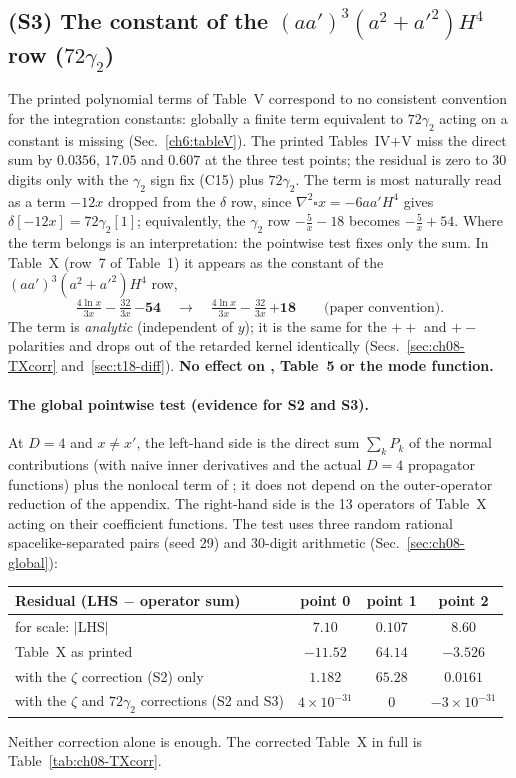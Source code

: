 \subsection*{(S3) The constant of the $(aa')^3(a^2+a'^2)H^4$ row ($72\gamma_2$)}
\begin{discbox}
The printed polynomial terms of Table~V correspond to no consistent convention for the integration constants: globally a finite term equivalent
to $72\gamma_2$ acting on a constant is missing (Sec.~\ref{ch6:tableV}). The printed Tables~IV$+$V miss the direct sum by $0.0356$, $17.05$ and
$0.607$ at the three test points; the residual is zero to 30 digits only with the $\gamma_2$ sign fix (C15) plus $72\gamma_2$.
The term is most naturally read as a term $-12x$ dropped from the $\delta$ row, since $\nabla^2\square x=-6aa'H^4$ gives $\delta[-12x]=72\gamma_2[1]$;
equivalently, the $\gamma_2$ row $-\tfrac5x-18$ becomes $-\tfrac5x+54$. Where the term belongs is an interpretation: the pointwise test fixes only the
sum. In Table~X (row~7 of \PII{} Table~1) it appears as the constant of the $(aa')^3(a^2+a'^2)H^4$ row,
\[
\tfrac{4\ln x}{3x}-\tfrac{32}{3x}\,\mathbf{-54}\quad\longrightarrow\quad\tfrac{4\ln x}{3x}-\tfrac{32}{3x}\,\mathbf{+18}
\qquad\text{(paper convention)}.
\]
The term is \emph{analytic} (independent of $y$); it is the same for the $++$ and $+-$ polarities and drops out of the retarded kernel identically
(Secs.~\ref{sec:ch08-TXcorr} and~\ref{sec:t18-diff}). \textbf{No effect on , Table~5 or the mode function.}
\end{discbox}

\paragraph{The global pointwise test (evidence for S2 and S3).} At $D=4$ and $x\neq x'$, the left-hand side is the direct sum $\sum_kP_k$ of the
normal contributions (with naive inner derivatives and the actual $D=4$ propagator functions) plus the nonlocal term of ; it does not depend
on the outer-operator reduction of the appendix. The right-hand side is the 13 operators of Table~X acting on their coefficient functions. The test
uses three random rational spacelike-separated pairs (seed 29) and 30-digit arithmetic (Sec.~\ref{sec:ch08-global}):
\begin{center}\small
\renewcommand{\arraystretch}{1.2}
\begin{tabular}{lccc}
\toprule
Residual (LHS $-$ operator sum) & point 0 & point 1 & point 2\\
\midrule
for scale: $|$LHS$|$ & $7.10$ & $0.107$ & $8.60$\\
Table~X as printed & $-11.52$ & $64.14$ & $-3.526$\\
with the $\zeta$ correction (S2) only & $1.182$ & $65.28$ & $0.0161$\\
with the $\zeta$ and $72\gamma_2$ corrections (S2 and S3) & $4\times10^{-31}$ & $0$ & $-3\times10^{-31}$\\
\bottomrule
\end{tabular}
\end{center}
Neither correction alone is enough. The corrected Table~X in full is Table~\ref{tab:ch08-TXcorr}.

